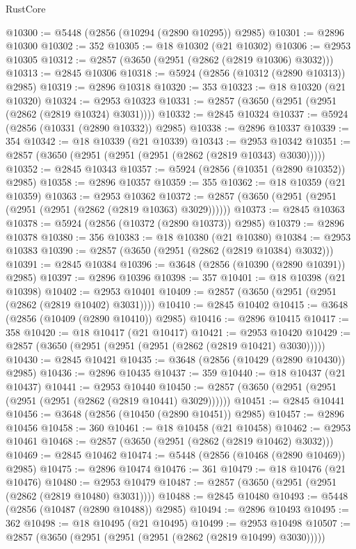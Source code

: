 \begin{lexlean}{RustCore}
\begin{coremodule}
@10300 := @5448 (@2856 (@10294 (@2890 @10295)) @2985)
@10301 := @2896 @10300
@10302 := 352
@10305 := @18 @10302 (@21 @10302)
@10306 := @2953 @10305
@10312 := @2857 (@3650 (@2951 (@2862 (@2819 @10306) @3032)))
@10313 := @2845 @10306
@10318 := @5924 (@2856 (@10312 (@2890 @10313)) @2985)
@10319 := @2896 @10318
@10320 := 353
@10323 := @18 @10320 (@21 @10320)
@10324 := @2953 @10323
@10331 := @2857 (@3650 (@2951 (@2951 (@2862 (@2819 @10324) @3031))))
@10332 := @2845 @10324
@10337 := @5924 (@2856 (@10331 (@2890 @10332)) @2985)
@10338 := @2896 @10337
@10339 := 354
@10342 := @18 @10339 (@21 @10339)
@10343 := @2953 @10342
@10351 := @2857 (@3650 (@2951 (@2951 (@2951 (@2862 (@2819 @10343) @3030)))))
@10352 := @2845 @10343
@10357 := @5924 (@2856 (@10351 (@2890 @10352)) @2985)
@10358 := @2896 @10357
@10359 := 355
@10362 := @18 @10359 (@21 @10359)
@10363 := @2953 @10362
@10372 := @2857 (@3650 (@2951 (@2951 (@2951 (@2951 (@2862 (@2819 @10363) @3029))))))
@10373 := @2845 @10363
@10378 := @5924 (@2856 (@10372 (@2890 @10373)) @2985)
@10379 := @2896 @10378
@10380 := 356
@10383 := @18 @10380 (@21 @10380)
@10384 := @2953 @10383
@10390 := @2857 (@3650 (@2951 (@2862 (@2819 @10384) @3032)))
@10391 := @2845 @10384
@10396 := @3648 (@2856 (@10390 (@2890 @10391)) @2985)
@10397 := @2896 @10396
@10398 := 357
@10401 := @18 @10398 (@21 @10398)
@10402 := @2953 @10401
@10409 := @2857 (@3650 (@2951 (@2951 (@2862 (@2819 @10402) @3031))))
@10410 := @2845 @10402
@10415 := @3648 (@2856 (@10409 (@2890 @10410)) @2985)
@10416 := @2896 @10415
@10417 := 358
@10420 := @18 @10417 (@21 @10417)
@10421 := @2953 @10420
@10429 := @2857 (@3650 (@2951 (@2951 (@2951 (@2862 (@2819 @10421) @3030)))))
@10430 := @2845 @10421
@10435 := @3648 (@2856 (@10429 (@2890 @10430)) @2985)
@10436 := @2896 @10435
@10437 := 359
@10440 := @18 @10437 (@21 @10437)
@10441 := @2953 @10440
@10450 := @2857 (@3650 (@2951 (@2951 (@2951 (@2951 (@2862 (@2819 @10441) @3029))))))
@10451 := @2845 @10441
@10456 := @3648 (@2856 (@10450 (@2890 @10451)) @2985)
@10457 := @2896 @10456
@10458 := 360
@10461 := @18 @10458 (@21 @10458)
@10462 := @2953 @10461
@10468 := @2857 (@3650 (@2951 (@2862 (@2819 @10462) @3032)))
@10469 := @2845 @10462
@10474 := @5448 (@2856 (@10468 (@2890 @10469)) @2985)
@10475 := @2896 @10474
@10476 := 361
@10479 := @18 @10476 (@21 @10476)
@10480 := @2953 @10479
@10487 := @2857 (@3650 (@2951 (@2951 (@2862 (@2819 @10480) @3031))))
@10488 := @2845 @10480
@10493 := @5448 (@2856 (@10487 (@2890 @10488)) @2985)
@10494 := @2896 @10493
@10495 := 362
@10498 := @18 @10495 (@21 @10495)
@10499 := @2953 @10498
@10507 := @2857 (@3650 (@2951 (@2951 (@2951 (@2862 (@2819 @10499) @3030)))))

\end{coremodule}
\end{lexlean}
